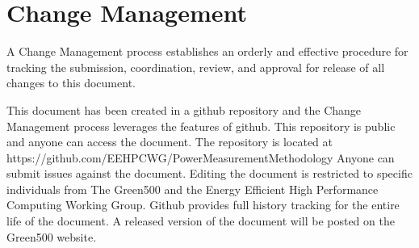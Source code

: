 \chapter{Change Management}
\label{sec:changenotices}

\noindent
A Change Management process establishes an orderly and effective procedure for tracking the submission, coordination, review, and approval for release of all changes to this document. 

This document has been created in a github repository and the Change Management process leverages the features of github.
This repository is public and anyone can access the document.  
The repository is located at https://github.com/EEHPCWG/PowerMeasurementMethodology
Anyone can submit issues against the document.  
Editing the document is restricted to specific individuals from The Green500 and the Energy Efficient High Performance Computing Working Group.
Github provides full history tracking for the entire life of the document.
A released version of the document will be posted on the Green500 website.
